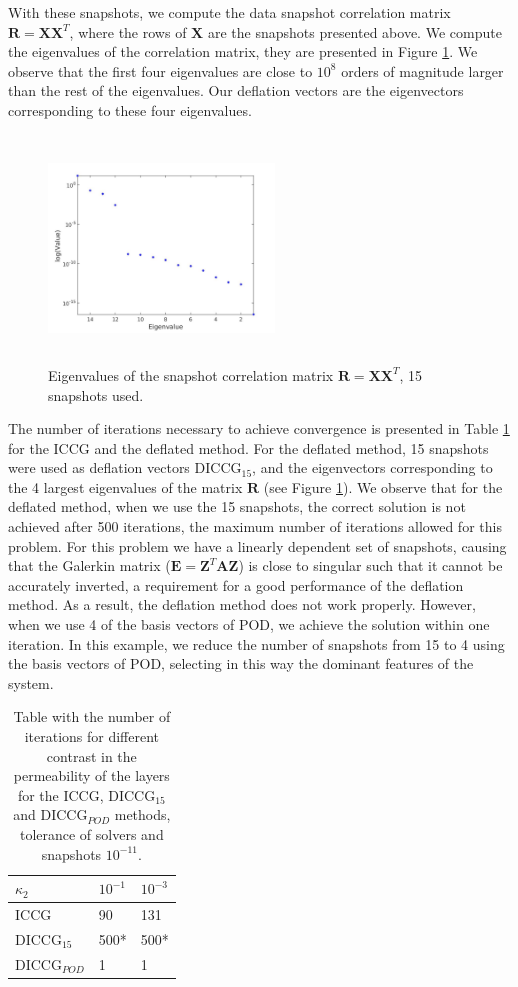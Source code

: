 \documentclass{ecmorXV}
\begin{document}
With these snapshots, we compute the data snapshot correlation matrix $\mathbf{R}=\mathbf{X}\mathbf{X}^T$,
where the rows of $\mathbf{X}$ are the snapshots presented above. We compute the eigenvalues of the correlation
matrix, they are presented in Figure \ref{fig:eig}. We observe that the first four eigenvalues 
are close to $10^8$ orders of magnitude larger than the rest of the eigenvalues. Our deflation vectors are 
the eigenvectors corresponding to these four eigenvalues.
\begin{figure}[!h]
 \centering
\includegraphics[width=6cm,height=6cm,keepaspectratio]
{eig_pod_het.jpg}
\caption{Eigenvalues of the snapshot correlation matrix $\mathbf{R}=\mathbf{X}\mathbf{X}^T$, 15 snapshots used.}
\label{fig:eig}
\end{figure}  
The number of iterations necessary to achieve convergence is presented in Table \ref{table:POD15} for the
ICCG and the deflated method. For the deflated method, 15 snapshots were used as deflation vectors DICCG$_{15}$,
and the eigenvectors corresponding to the 4 largest eigenvalues of the matrix $\mathbf{R}$ (see Figure \ref{fig:eig}). 
We observe that for the deflated method, when we use the 15 snapshots, the 
correct solution is not achieved after 500 iterations, the maximum number of iterations allowed for this problem.
For this problem we have a linearly dependent set of snapshots, causing that the
Galerkin matrix ($\mathbf{E}=\mathbf{Z}^T\mathbf{A}\mathbf{Z}$) is close to singular such that it cannot
be accurately inverted, a requirement for a good performance of the deflation method. 
As a result, the deflation method does not work properly.
However, when we use 4 of the basis vectors of POD, we achieve the 
solution within one iteration. In this example, we reduce the number of snapshots from 15 to 4 using 
the basis vectors of POD, selecting in this way the dominant features of the system.  
\begin{table}[!ht]
\centering
\begin{tabular}{ |p{2.5cm}|p{1.5cm}|p{1.5cm}|} 
\hline
$\kappa_2$& $10^{-1}$ &$10^{-3}$  \\
 \hline
  ICCG  & 90& 131\\ 
  DICCG$_{15}$  & 500* &500*\\ 
  DICCG$_{POD}$ & 1& 1\\
 \hline
\end{tabular}
\caption{Table with the number of iterations for different contrast in the permeability of the layers
for the ICCG, DICCG$_{15}$ and DICCG$_{POD}$ methods, tolerance of solvers and snapshots $10^{-11}$. }
\label{table:POD15}
\end{table}   
    
\end{document}
